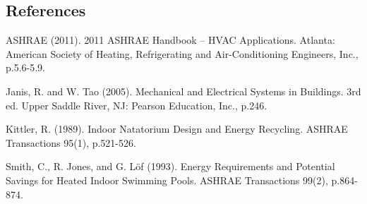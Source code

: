 \subsection{References}\label{references-030}

ASHRAE (2011). 2011 ASHRAE Handbook -- HVAC Applications. Atlanta: American Society of Heating, Refrigerating and Air-Conditioning Engineers, Inc., p.5.6-5.9.

Janis, R. and W. Tao (2005). Mechanical and Electrical Systems in Buildings. 3rd ed. Upper Saddle River, NJ: Pearson Education, Inc., p.246.

Kittler, R. (1989). Indoor Natatorium Design and Energy Recycling. ASHRAE Transactions 95(1), p.521-526.

Smith, C., R. Jones, and G. Löf (1993). Energy Requirements and Potential Savings for Heated Indoor Swimming Pools. ASHRAE Transactions 99(2), p.864-874.
